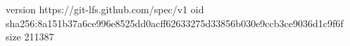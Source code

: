 version https://git-lfs.github.com/spec/v1
oid sha256:8a151b37a6ce996e8525dd0acff62633275d33856b030e9ccb3ce9036d1c9f6f
size 211387
